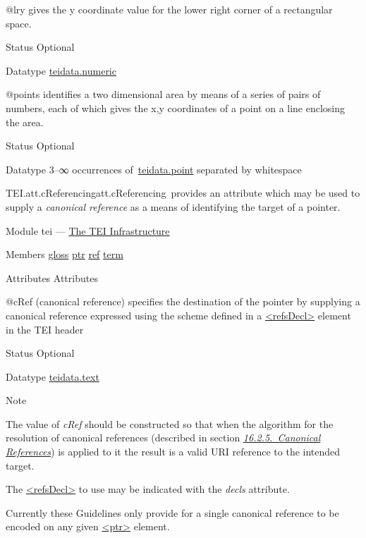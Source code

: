\begin{reflist}
\begin{sansreflist}
    \item[@lry]
  gives the y coordinate value for the lower right corner of a rectangular space.
\begin{reflist}
    \item[{Status}]
  Optional
    \item[{Datatype}]
  \hyperref[TEI.teidata.numeric]{teidata.numeric}
\end{reflist}  
    \item[@points]
  identifies a two dimensional area by means of a series of pairs of numbers, each of which gives the x,y coordinates of a point on a line enclosing the area.
\begin{reflist}
    \item[{Status}]
  Optional
    \item[{Datatype}]
  3–∞ occurrences of \hyperref[TEI.teidata.point]{teidata.point} separated by whitespace
\end{reflist}  
\end{sansreflist}  
\end{reflist}  
\begin{reflist}
\item[]\begin{specHead}{TEI.att.cReferencing}{att.cReferencing} provides an attribute which may be used to supply a \textit{canonical reference} as a means of identifying the target of a pointer.\end{specHead} 
    \item[{Module}]
  tei — \hyperref[ST]{The TEI Infrastructure}
    \item[{Members}]
  \hyperref[TEI.gloss]{gloss} \hyperref[TEI.ptr]{ptr} \hyperref[TEI.ref]{ref} \hyperref[TEI.term]{term}
    \item[{Attributes}]
  Attributes\hfil\\[-10pt]\begin{sansreflist}
    \item[@cRef]
  (canonical reference) specifies the destination of the pointer by supplying a canonical reference expressed using the scheme defined in a \hyperref[TEI.refsDecl]{<refsDecl>} element in the TEI header
\begin{reflist}
    \item[{Status}]
  Optional
    \item[{Datatype}]
  \hyperref[TEI.teidata.text]{teidata.text}
    \item[{Note}]
  \par
The value of {\itshape cRef} should be constructed so that when the algorithm for the resolution of canonical references (described in section \textit{\hyperref[SACR]{16.2.5.\ Canonical References}}) is applied to it the result is a valid URI reference to the intended target.\par
The \hyperref[TEI.refsDecl]{<refsDecl>} to use may be indicated with the {\itshape decls} attribute.\par
Currently these Guidelines only provide for a single canonical reference to be encoded on any given \hyperref[TEI.ptr]{<ptr>} element.
\end{reflist}  
\end{sansreflist}  
\end{reflist}  
